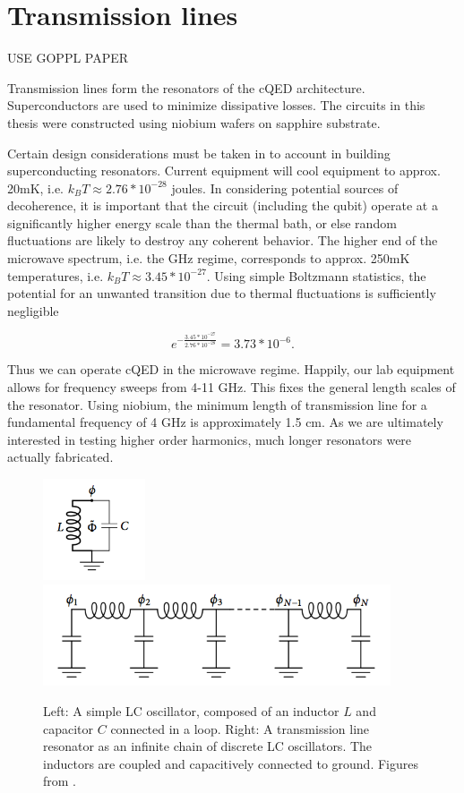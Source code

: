 \documentclass[11 pt, oneside]{book} %
\begin{document}
\section{Transmission lines}\label{sec:TransmissionLines}
USE GOPPL PAPER

Transmission lines form the resonators of the cQED architecture. Superconductors are used to minimize dissipative losses. The circuits in this thesis were constructed using niobium wafers on sapphire substrate.

Certain design considerations must be taken in to account in building superconducting resonators. Current equipment will cool equipment  to approx. 20mK, i.e. $k_BT\approx2.76*10^{-28}$ joules. In considering potential sources of decoherence, it is important that the circuit (including the qubit) operate at a significantly higher energy scale than the thermal bath, or else random fluctuations are likely to destroy any coherent behavior. The higher end of the microwave spectrum, i.e. the GHz regime, corresponds to approx. 250mK temperatures, i.e. $k_BT\approx3.45*10^{-27}$. Using simple Boltzmann statistics, the potential for an unwanted transition due to thermal fluctuations is sufficiently negligible

\begin{equation}
e^{-\frac{3.45*10^{-27}}{2.76*10^{-28}}}=3.73*10^{-6}.
\end{equation}

Thus we can operate cQED in the microwave regime. Happily, our lab equipment allows for frequency sweeps from 4-11 GHz. This fixes the general length scales of the resonator. Using niobium, the minimum length of transmission line for a fundamental frequency of 4 GHz is approximately 1.5 cm. As we are ultimately interested in testing higher order harmonics, much longer resonators were actually fabricated. 

\begin{figure}[h] 
   \centering
   \includegraphics[height=3cm]{BishopLC.png} \includegraphics[height=3cm]{BishopLCChain.png} 
   \caption[LC oscillator]{Left: A simple LC oscillator, composed of an inductor $L$ and capacitor $C$ connected in a loop. Right: A transmission line resonator as an infinite chain of discrete LC oscillators. The inductors are coupled and capacitively connected to ground. Figures from \cite{Bishop}.}
   \label{fig:LCOscillator}
\end{figure}
\end{document}

